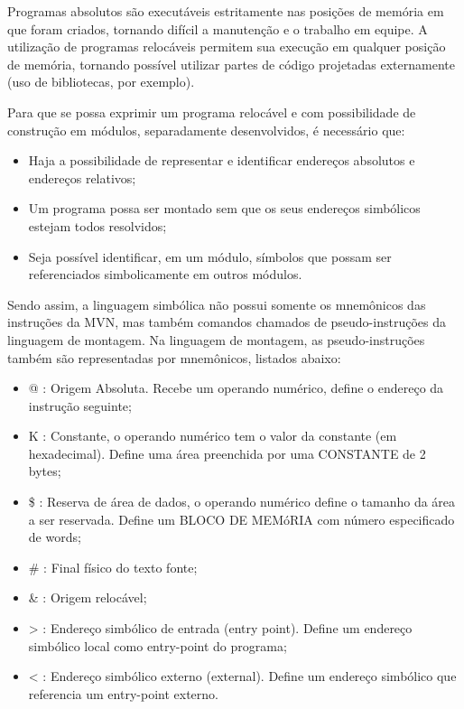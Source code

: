 
Programas absolutos são executáveis estritamente nas posições de memória em que foram criados, tornando difícil a manutenção e o trabalho em equipe. A utilização de programas relocáveis permitem sua execução em qualquer posição de memória, tornando possível utilizar partes de código projetadas externamente (uso de bibliotecas, por exemplo).

Para que se possa exprimir um programa relocável e com possibilidade de construção em módulos, separadamente desenvolvidos, é necessário que:
\begin{itemize}
	\item Haja a possibilidade de representar e identificar endereços absolutos e endereços relativos;
	\item Um programa possa ser montado sem que os seus endereços simbólicos estejam todos resolvidos;
	\item Seja possível identificar, em um módulo, símbolos que possam ser referenciados simbolicamente em outros módulos.
\end{itemize}

Sendo assim, a linguagem simbólica não possui somente os mnemônicos das instruções da MVN, mas também comandos chamados de pseudo-instruções da linguagem de montagem. Na linguagem de montagem, as pseudo-instruções também são representadas por mnemônicos, listados abaixo:

\begin{itemize}
	\item @ : Origem Absoluta. Recebe um operando numérico, define o endereço da instrução seguinte;
	\item K : Constante, o operando numérico tem o valor da constante (em hexadecimal). Define uma área preenchida por uma CONSTANTE de 2 bytes;
	\item \$ : Reserva de área de dados, o operando numérico define o tamanho da área a ser reservada. Define um BLOCO DE MEMóRIA com número especificado de words;
	\item \# : Final físico do texto fonte;
	\item \& : Origem relocável;
	\item > : Endereço simbólico de entrada (entry point). Define um endereço simbólico local como entry-point do programa;
	\item < : Endereço simbólico externo (external). Define um endereço simbólico que referencia um entry-point externo.
\end{itemize}

